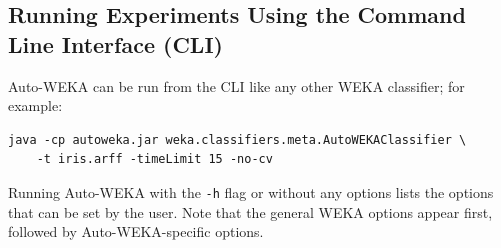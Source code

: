 \documentclass{article}
\begin{document}
\subsection{Running Experiments Using the Command Line Interface (CLI)}\label{sec:running}

Auto-WEKA can be run from the CLI like any other WEKA classifier; for example:
\begin{verbatim}
java -cp autoweka.jar weka.classifiers.meta.AutoWEKAClassifier \
    -t iris.arff -timeLimit 15 -no-cv
\end{verbatim}

Running Auto-WEKA with the \verb=-h= flag or without any options lists the
options that can be set by the user. Note that the general WEKA options appear
first, followed by Auto-WEKA-specific options.
\end{document}
